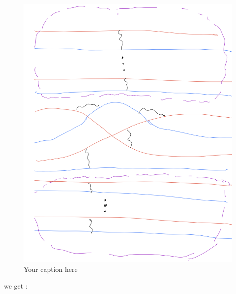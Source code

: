 \begin{figure}[H] %
    \centering
    \includegraphics[width=\linewidth]{diagrams/definition12/7.png} %
    \caption{Your caption here}
    \label{fig:your-label}
\end{figure}

we get :

